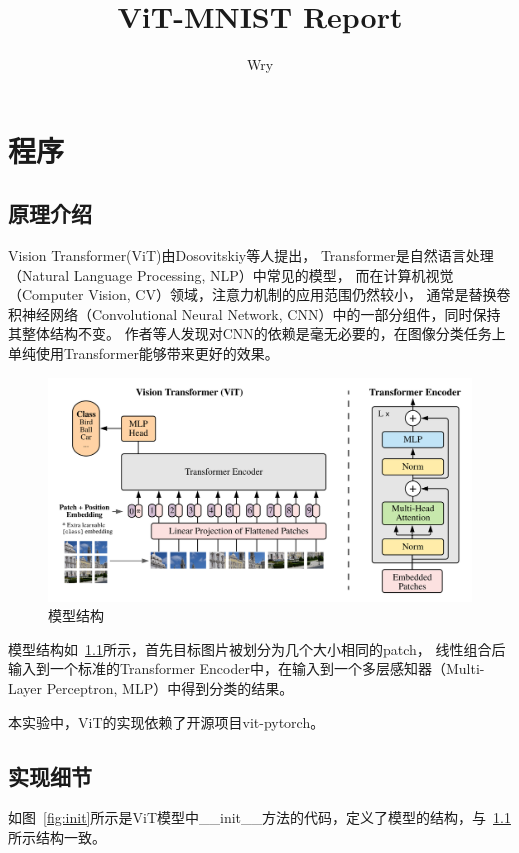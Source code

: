 \documentclass[UTF8]{ctexrep}
\title{ViT-MNIST Report}
\author{Wry}
\begin{document}
\maketitle

\chapter{程序}
\section{原理介绍}
Vision Transformer(ViT)由Dosovitskiy等人\cite{dosovitskiy2021an}提出，
Transformer是自然语言处理（Natural Language Processing, NLP）中常见的模型，
而在计算机视觉（Computer Vision, CV）领域，注意力机制的应用范围仍然较小，
通常是替换卷积神经网络（Convolutional Neural Network, CNN）中的一部分组件，同时保持其整体结构不变。
作者等人发现对CNN的依赖是毫无必要的，在图像分类任务上单纯使用Transformer能够带来更好的效果。

\begin{figure}[htbp]
    \centering
    \includegraphics[width=0.9\linewidth]{model-overview.png}
    \caption{模型结构}
    \label{fig:model-overview}
\end{figure}

模型结构如~\ref{fig:model-overview}所示，首先目标图片被划分为几个大小相同的patch，
线性组合后输入到一个标准的Transformer Encoder中，在输入到一个多层感知器（Multi-Layer Perceptron, MLP）中得到分类的结果。

本实验中，ViT的实现依赖了开源项目vit-pytorch\cite{vit-torch}。

\section{实现细节}
如图~\ref{fig:init}所示是ViT模型中\_\_init\_\_方法的代码，定义了模型的结构，与~\ref{fig:model-overview}所示结构一致。
\end{document}
